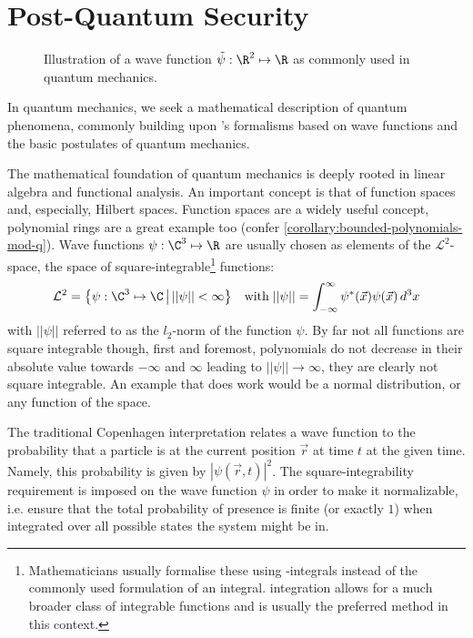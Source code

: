 \pagebreak
\section{Post-Quantum Security}
\label{sec:post-quantum-sec}
\begin{figure}[H]
  \centering
  \caption[Illustration of a wave function]{Illustration of a wave function $\tilde{\psi}: \R^2 \mapsto \R$ as commonly used in quantum mechanics.}
  \label{fig:wave-function}
\end{figure}

In quantum mechanics, we seek a mathematical description of quantum phenomena, commonly building upon 's formalisms based on wave functions and the basic postulates of quantum mechanics.

The mathematical foundation of quantum mechanics is deeply rooted in linear algebra and functional analysis.
An important concept is that of function spaces and, especially, Hilbert spaces.
Function spaces are a widely useful concept, polynomial rings are a great example too (confer \cref{corollary:bounded-polynomials-mod-q}).
Wave functions $\psi: \C^3 \mapsto \R$ are usually chosen as elements of the $\mathcal{L}^2$-space, the space of square-integrable\footnote{Mathematicians usually formalise these using -integrals instead of the commonly used  formulation of an integral.  integration allows for a much broader class of integrable functions and is usually the preferred method in this context.} functions:
$$\mathcal{L}^2 = \big\{\psi: \C^3 \mapsto \C \,\big|\, ||\psi|| < \infty\big\} \quad \text{with} \; ||\psi|| = \int_{-\infty}^{\infty} \psi^*(\vec{x}) \psi(\vec{x}) \,d^3x$$
with $||\psi||$ referred to as the $l_2$-norm of the function $\psi$.
By far not all functions are square integrable though, first and foremost, polynomials do not decrease in their absolute value towards $-\infty$ and $\infty$ leading to $||\psi|| \rightarrow \infty$, they are clearly not square integrable.
An example that does work would be a normal distribution, or any function of the  space.

The traditional Copenhagen interpretation relates a wave function to the probability that a particle is at the current position $\vec{r}$ at time $t$ at the given time.
Namely, this probability is given by $|\psi(\vec{r}, t)|^2$.
The square-integrability requirement is imposed on the wave function $\psi$ in order to make it normalizable, i.e. ensure that the total probability of presence is finite (or exactly $1$) when integrated over all possible states the system might be in.

